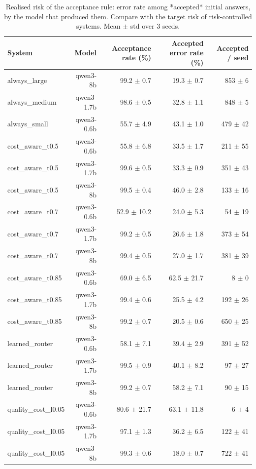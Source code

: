 \begin{table}[t]
\centering
\small
\caption{Realised risk of the acceptance rule: error rate among *accepted* initial answers, by the model that produced them. Compare with the target risk of risk-controlled systems. Mean $\pm$ std over 3 seeds.}
\label{tab:acceptance}
\begin{tabular}{lrrrr}
\toprule
System & Model & Acceptance rate (\%) & Accepted error rate (\%) & Accepted / seed \\
\midrule
always\_large & qwen3-8b & 99.2 $\pm$ 0.7 & 19.3 $\pm$ 0.7 & 853 $\pm$ 6 \\
always\_medium & qwen3-1.7b & 98.6 $\pm$ 0.5 & 32.8 $\pm$ 1.1 & 848 $\pm$ 5 \\
always\_small & qwen3-0.6b & 55.7 $\pm$ 4.9 & 43.1 $\pm$ 1.0 & 479 $\pm$ 42 \\
cost\_aware\_t0.5 & qwen3-0.6b & 55.8 $\pm$ 6.8 & 33.5 $\pm$ 1.7 & 211 $\pm$ 55 \\
cost\_aware\_t0.5 & qwen3-1.7b & 99.6 $\pm$ 0.5 & 33.3 $\pm$ 0.9 & 351 $\pm$ 43 \\
cost\_aware\_t0.5 & qwen3-8b & 99.5 $\pm$ 0.4 & 46.0 $\pm$ 2.8 & 133 $\pm$ 16 \\
cost\_aware\_t0.7 & qwen3-0.6b & 52.9 $\pm$ 10.2 & 24.0 $\pm$ 5.3 & 54 $\pm$ 19 \\
cost\_aware\_t0.7 & qwen3-1.7b & 99.2 $\pm$ 0.5 & 26.6 $\pm$ 1.8 & 373 $\pm$ 54 \\
cost\_aware\_t0.7 & qwen3-8b & 99.4 $\pm$ 0.5 & 27.0 $\pm$ 1.7 & 381 $\pm$ 39 \\
cost\_aware\_t0.85 & qwen3-0.6b & 69.0 $\pm$ 6.5 & 62.5 $\pm$ 21.7 & 8 $\pm$ 0 \\
cost\_aware\_t0.85 & qwen3-1.7b & 99.4 $\pm$ 0.6 & 25.5 $\pm$ 4.2 & 192 $\pm$ 26 \\
cost\_aware\_t0.85 & qwen3-8b & 99.2 $\pm$ 0.7 & 20.5 $\pm$ 0.6 & 650 $\pm$ 25 \\
learned\_router & qwen3-0.6b & 58.1 $\pm$ 7.1 & 39.4 $\pm$ 2.9 & 391 $\pm$ 52 \\
learned\_router & qwen3-1.7b & 99.5 $\pm$ 0.9 & 40.1 $\pm$ 8.2 & 97 $\pm$ 27 \\
learned\_router & qwen3-8b & 99.2 $\pm$ 0.7 & 58.2 $\pm$ 7.1 & 90 $\pm$ 15 \\
quality\_cost\_l0.05 & qwen3-0.6b & 80.6 $\pm$ 21.7 & 63.1 $\pm$ 11.8 & 6 $\pm$ 4 \\
quality\_cost\_l0.05 & qwen3-1.7b & 97.1 $\pm$ 1.3 & 36.2 $\pm$ 6.5 & 122 $\pm$ 41 \\
quality\_cost\_l0.05 & qwen3-8b & 99.3 $\pm$ 0.6 & 18.0 $\pm$ 0.7 & 722 $\pm$ 41 \\

\end{tabular}
\end{table}
